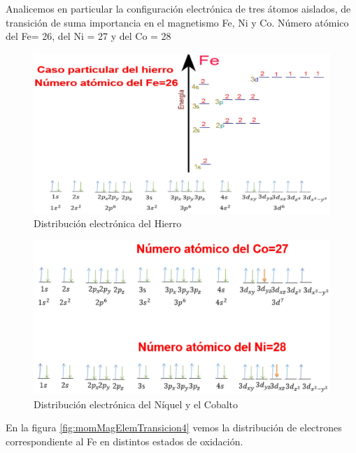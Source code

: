 Analicemos en particular la configuración electrónica de tres átomos aislados, de
transición de suma importancia en el magnetismo Fe, Ni y Co. Número atómico del Fe= 26, del Ni = 27 y del Co = 28
\vspace{1.0cm}

\begin{figure}[H]
    \centering
    \includegraphics[width=1.0\textwidth]{./Figures/casoDelFe}
	\caption{Distribución electrónica del Hierro}
	\label{fig:casoDelFe}
\end{figure}

\begin{figure}[H]
    \centering
    \includegraphics[width=1.0\textwidth]{./Figures/casoDelNiCo}
	\caption{Distribución electrónica del Níquel y el Cobalto}
	\label{fig:casoDelNiCo}
\end{figure}

En la figura \ref{fig:momMagElemTransicion4} vemos la distribución de electrones correspondiente al Fe en distintos estados de oxidación.


